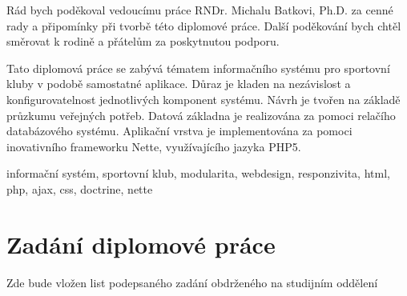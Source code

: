 \documentclass[11pt,oneside]{fithesis}
\begin{document}
\FrontMatter
\ThesisTitlePage
\begin{ThesisDeclaration}
\DeclarationText
\AdvisorName
\end{ThesisDeclaration}

\begin{ThesisThanks}
Rád bych poděkoval vedoucímu práce RNDr. Michalu Batkovi, Ph.D. za cenné rady a připomínky při tvorbě této diplomové práce. Další poděkování bych chtěl směrovat k rodině a přátelům za poskytnutou podporu.
\end{ThesisThanks}

\begin{ThesisAbstract}
Tato diplomová práce se zabývá tématem informačního systému pro sportovní kluby v podobě samostatné aplikace. Důraz je kladen na nezávislost a konfigurovatelnost jednotlivých komponent systému. Návrh je tvořen na základě průzkumu veřejných potřeb. Datová základna je realizována za pomoci relačího databázového systému. Aplikační vrstva je implementována za pomoci inovativního frameworku Nette, využívajícího jazyka PHP5.

\end{ThesisAbstract}

\begin{ThesisKeyWords}
informační systém, sportovní klub, modularita, webdesign, responzivita, html, php, ajax, css, doctrine, nette
\end{ThesisKeyWords}

\MainMatter
\tableofcontents















\chapter{Zadání diplomové práce}
Zde bude vložen list podepsaného zadání obdrženého na studijním oddělení


















\end{document}
